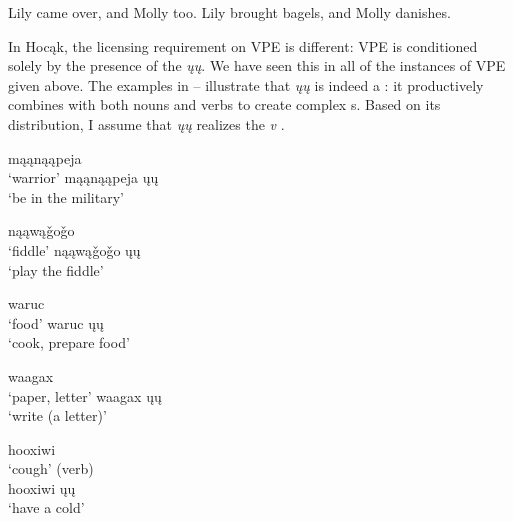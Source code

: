 \documentclass[output=paper]{LSP/langsci}
\begin{document}
\ea\label{ex:johnson:13}
\ea\label{ex:johnson:13a}
Lily came over, and Molly too.
\ex\label{ex:johnson:13b} 
Lily brought bagels, and Molly danishes.
\z
\z

 
In Hocąk, the licensing requirement on VPE is different: VPE is conditioned solely by the presence of the  \emph{ųų}. We have seen this in all of the instances of VPE given above. The examples in -- illustrate that \emph{ųų} is indeed a : it productively combines with both nouns and verbs to create complex s. Based on its distribution, I assume that \emph{ųų} realizes the  \emph{v} \citep[Examples 14--18]{Hartmann2012}.
 
 
\ea\label{ex:johnson:14}
\begin{multicols}{2}
\ea 
mąąnąąpeja\\
`warrior'
\ex 
mąąnąąpeja ųų\\
`be in the military'
\z
\end{multicols}
\z
 
\ea\label{ex:johnson:15}
\begin{multicols}{2}
\ea 
nąąwą\v{g}o\v{g}o\\
`fiddle'
\ex 
nąąwą\v{g}o\v{g}o ųų\\
`play the fiddle'
\z
\end{multicols}
\z
 
\ea\label{ex:johnson:16}
\begin{multicols}{2}
\ea 
waruc\\
`food'
\ex 
waruc ųų\\
`cook, prepare food'
\z
\end{multicols}
\z
 
\ea\label{ex:johnson:17}
\begin{multicols}{2}
\ea 
waagax\\
`paper, letter'
\ex 
waagax ųų\\
`write (a letter)'
\z
\end{multicols}
\z
 
\ea\label{ex:johnson:18}
\begin{multicols}{2}
\ea 
hooxiwi\\
`cough' (verb)\\

\ex 
hooxiwi ųų\\
`have a cold'
\z
\end{multicols}
\z
\end{document}
